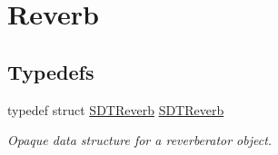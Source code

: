 \hypertarget{group__reverb}{}\section{Reverb}
\label{group__reverb}
\subsection*{Typedefs}
\begin{DoxyCompactItemize}
\item 
\hypertarget{group__reverb_ga572fe1bba384610f4d05431c8f2bed73}{}typedef struct \hyperlink{group__reverb_ga572fe1bba384610f4d05431c8f2bed73}{S\+D\+T\+Reverb} \hyperlink{group__reverb_ga572fe1bba384610f4d05431c8f2bed73}{S\+D\+T\+Reverb}\label{group__reverb_ga572fe1bba384610f4d05431c8f2bed73}

\begin{DoxyCompactList}\small\item\em Opaque data structure for a reverberator object. \end{DoxyCompactList}\end{DoxyCompactItemize}
